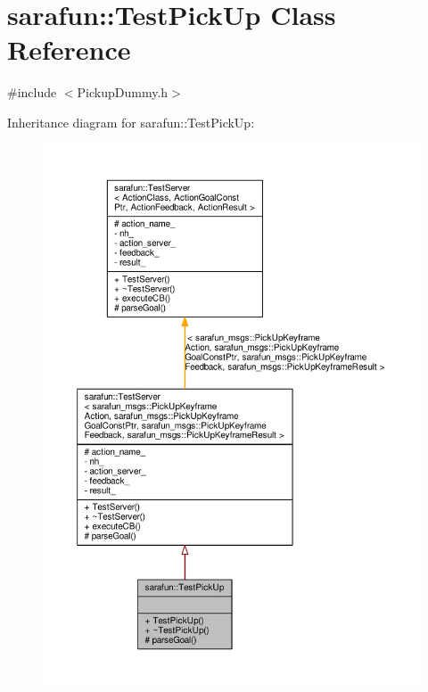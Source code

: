 \hypertarget{classsarafun_1_1TestPickUp}{\section{sarafun\-:\-:Test\-Pick\-Up Class Reference}
\label{classsarafun_1_1TestPickUp}
}


{\ttfamily \#include $<$Pickup\-Dummy.\-h$>$}



Inheritance diagram for sarafun\-:\-:Test\-Pick\-Up\-:
\nopagebreak
\begin{figure}[H]
\begin{center}
\leavevmode
\includegraphics[width=350pt]{d0/da2/classsarafun_1_1TestPickUp__inherit__graph}
\end{center}
\end{figure}


